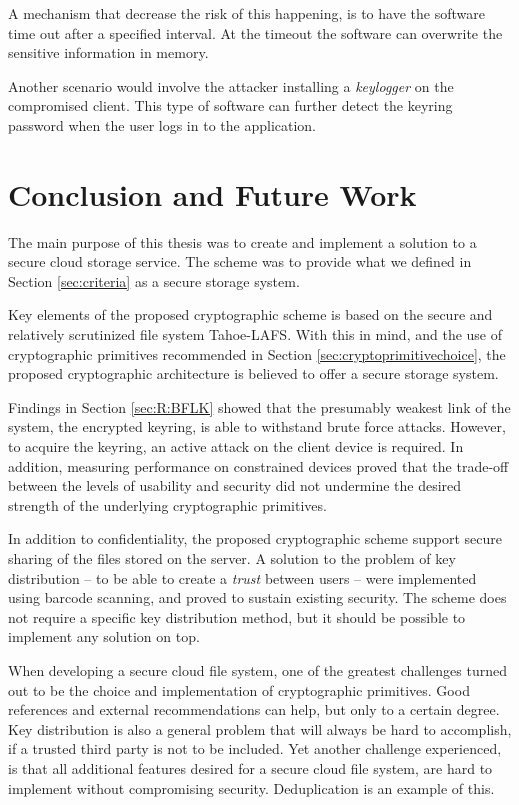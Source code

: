\documentclass[pdftex,english,10pt,b5paper,twoside]{book}
\begin{document}
A mechanism that decrease the risk of this happening, is to have the software
time out after a specified interval. At the timeout the software can overwrite
the sensitive information in memory.

Another scenario would involve the attacker installing a \emph{keylogger} on
the compromised client. This type of software can further detect the keyring
password when the user logs in to the application.

\chapter{Conclusion and Future Work}
\label{ch:conclusion}

The main purpose of this thesis was to create and implement a solution to a
secure cloud storage service. The scheme was to provide what we defined in
Section \ref{sec:criteria} as a secure storage system. 

Key elements of the proposed cryptographic scheme is based on the secure and
relatively scrutinized file system Tahoe-\ac{LAFS}. With this in mind, and the
use of cryptographic primitives recommended in Section
\ref{sec:cryptoprimitivechoice}, the proposed cryptographic architecture is
believed to offer a secure storage system. 

Findings in Section \ref{sec:R:BFLK} showed that the presumably weakest link of
the system, the encrypted keyring, is able to withstand brute force attacks.
However, to acquire the keyring, an active attack on the client device is
required. In addition, measuring performance on constrained devices proved that
the trade-off between the levels of usability and security did not undermine
the desired strength of the underlying cryptographic primitives.

In addition to confidentiality, the proposed cryptographic scheme support
secure sharing of the files stored on the server. A solution to the problem of
key distribution -- to be able to create a \emph{trust} between users -- were
implemented using barcode scanning, and proved to sustain existing security.
The scheme does not require a specific key distribution method, but it should
be possible to implement any solution on top.

When developing a secure cloud file system, one of the greatest challenges
turned out to be the choice and implementation of cryptographic primitives.
Good references and external recommendations can help, but only to a certain
degree. Key distribution is also a general problem that will always be hard to
accomplish, if a trusted third party is not to be included. Yet another
challenge experienced, is that all additional features desired for a secure
cloud file system, are hard to implement without compromising security.
Deduplication is an example of this.
\end{document}
